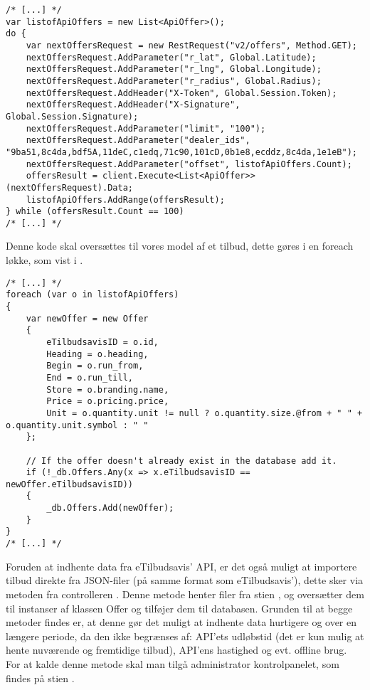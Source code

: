 \begin{lstlisting}[caption=C\#-kode som anvender ``/v2/offers'' delen af API'et til at hente tilbud., label=apiofferscs]
/* [...] */
var listofApiOffers = new List<ApiOffer>();
do {
    var nextOffersRequest = new RestRequest("v2/offers", Method.GET);
    nextOffersRequest.AddParameter("r_lat", Global.Latitude);
    nextOffersRequest.AddParameter("r_lng", Global.Longitude);
    nextOffersRequest.AddParameter("r_radius", Global.Radius);
    nextOffersRequest.AddHeader("X-Token", Global.Session.Token);
    nextOffersRequest.AddHeader("X-Signature", Global.Session.Signature);
    nextOffersRequest.AddParameter("limit", "100");
    nextOffersRequest.AddParameter("dealer_ids", "9ba51,8c4da,bdf5A,11deC,c1edq,71c90,101cD,0b1e8,ecddz,8c4da,1e1eB");
    nextOffersRequest.AddParameter("offset", listofApiOffers.Count);
    offersResult = client.Execute<List<ApiOffer>>(nextOffersRequest).Data;
    listofApiOffers.AddRange(offersResult);
} while (offersResult.Count == 100)
/* [...] */
\end{lstlisting}

Denne kode skal oversættes til vores model af et tilbud, dette gøres i en foreach løkke, som vist i .

\begin{lstlisting}[caption={C\#-kode som bruger API-data til at oprette instancer af Offer-klassen, og tilføjer dem til databasen}, label=apiofferstooffercs]
/* [...] */
foreach (var o in listofApiOffers)
{
    var newOffer = new Offer
    {
        eTilbudsavisID = o.id,
        Heading = o.heading,
        Begin = o.run_from,
        End = o.run_till,
        Store = o.branding.name,
        Price = o.pricing.price,
        Unit = o.quantity.unit != null ? o.quantity.size.@from + " " + o.quantity.unit.symbol : " "
    };

    // If the offer doesn't already exist in the database add it.
    if (!_db.Offers.Any(x => x.eTilbudsavisID == newOffer.eTilbudsavisID))
    {
        _db.Offers.Add(newOffer);
    }
}
/* [...] */
\end{lstlisting}

Foruden at indhente data fra eTilbudsavis' API, er det også muligt at importere tilbud direkte fra JSON-filer (på samme format som eTilbudsavis'), dette sker via metoden  fra controlleren . 
Denne metode henter filer fra stien , og oversætter dem til instanser af klassen Offer og tilføjer dem til databasen. 
Grunden til at begge metoder findes er, at denne gør det muligt at indhente data hurtigere og over en længere periode, da den ikke begrænses af: API'ets udløbstid (det er kun mulig at hente nuværende og fremtidige tilbud), API'ens hastighed og evt. offline brug. 
For at kalde denne metode skal man tilgå administrator kontrolpanelet, som findes på stien .

